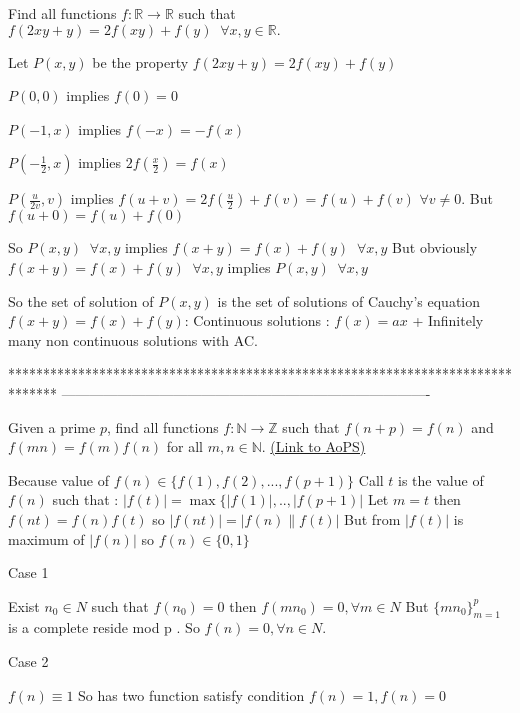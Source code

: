 \begin{mysolution}
	\begin{tcolorbox}Find all functions $ f: \mathbb{R}\to\mathbb{R}$ such that $ f(2xy + y) = 2f(xy) + f(y)\;\;\forall x,y\in\mathbb{R}.$\end{tcolorbox}

Let $ P(x,y)$ be the property $ f(2xy + y) = 2f(xy) + f(y)$

$ P(0,0)$ implies $ f(0)=0$

$ P(-1,x)$ implies $ f(-x)=-f(x)$

$ P(-\frac{1}{2},x)$ implies $ 2f(\frac{x}{2})=f(x)$

$ P(\frac{u}{2v},v)$ implies $ f(u+v)=2f(\frac{u}{2})+f(v)=f(u)+f(v)$ $ \forall v\neq 0$. But $ f(u+0)=f(u)+f(0)$

So $ P(x,y)\;\;\forall x,y$ implies $ f(x+y)=f(x)+f(y)\;\;\forall x,y$
But obviously $ f(x+y)=f(x)+f(y)\;\;\forall x,y$ implies $ P(x,y)\;\;\forall x,y$ 

So the set of solution of $ P(x,y)$ is the set of solutions of Cauchy's equation $ f(x+y)=f(x)+f(y)$:
Continuous solutions : $ f(x)=ax$
+ Infinitely many non continuous solutions with AC.
\end{mysolution}
*******************************************************************************
-------------------------------------------------------------------------------

\begin{problem}
	Given a prime $p$, find all functions $ f: \mathbb N \to \mathbb Z$ such that $ f(n+p)=f(n)$ and $ f(mn)=f(m)f(n)$ for all $m,n \in \mathbb N$.
	\flushright \href{https://artofproblemsolving.com/community/c6h177142}{(Link to AoPS)}
\end{problem}



\begin{mysolution}
	Because value of $ f(n)\in\{f(1),f(2),...,f(p + 1)\}$ 
Call $ t$ is the value of $ f(n)$ such that : 
${ |f(t)| = \max\{|f(1)|,..,|f(p + 1)|}$
Let $ m = t$ then 
$ f(nt) = f(n)f(t)$ so $ |f(nt)| = |f(n)\parallel{}f(t)|$ 
But from $ |f(t)|$ is maximum of $ |f(n)|$ so 
$ f(n)\in\{0,1\}$
 \begin{underlined}Case 1\end{underlined} Exist $ n_0\in N$ such that $ f(n_0) = 0$ then 
$ f(mn_0) = 0,\forall m\in N$ 
But $ \{m{n_0}\}_{m = 1}^{p}$ is a complete reside mod p . So $ f(n) = 0,\forall n\in N$.
\begin{underlined}Case 2\end{underlined} $ f(n)\equiv 1$
So has two function satisfy condition 
$ f(n) = 1,f(n) = 0$
\end{mysolution}



